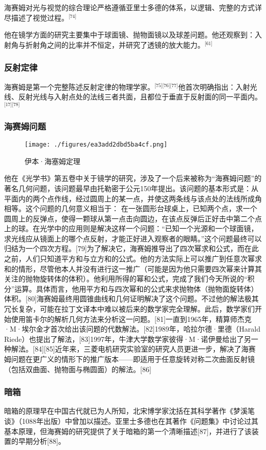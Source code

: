 海赛姆对光与视觉的综合理论严格遵循亚里士多德的体系，以逻辑、完整的方式详尽描述了视觉过程。\(^\text{[74]}\)

他在镜学方面的研究主要集中于球面镜、抛物面镜以及球差问题。他还观察到：入射角与折射角之间的比率并不恒定，并研究了透镜的放大能力。\(^\text{[61]}\)
\subsubsection{反射定律}
海赛姆是第一个完整陈述反射定律的物理学家。\(^\text{[75][76][77]}\)他首次明确指出：入射光线、反射光线与入射点处的法线三者共面，且都位于垂直于反射面的同一平面内。\(^\text{[17][78]}\)
\subsubsection{海赛姆问题}
\begin{figure}[ht]
\centering
\texttt{[image: ./figures/ea3add2dbd5ba4cf.png]}
\caption{伊本·海塞姆定理} \label{fig_YBH_3}
\end{figure}
他在《光学书》第五卷中关于镜学的研究，涉及了一个后来被称为“海赛姆问题”的著名几何问题，该问题最早由托勒密于公元150年提出。该问题的基本形式是：从平面内的两个点作线，经过圆周上的某一点，并使这两条线与该点处的法线所成角相等。这个问题的几何意义相当于：
在一张圆形台球桌上，已知两个点，求一个圆周上的反弹点，使得一颗球从第一点击向圆边，在该点反弹后正好击中第二个点上的球。在光学中的应用则是解决这样一个问题：“已知一个光源和一个球面镜，求光线应从镜面上的哪个点反射，才能正好进入观察者的眼睛。”这个问题最终可以归结为一个四次方程。[79]为了解决它，海赛姆推导出了四次幂求和公式，而在此之前，人们只知道平方和与立方和的公式。他的方法实际上可以推广到任意次幂求和的情形，尽管他本人并没有进行这一推广（可能是因为他只需要四次幂来计算其关注的抛物旋转体的体积）。他利用所得的幂和公式，完成了我们今天所说的“积分”运算。具体而言，他用平方和与四次幂和的公式来求抛物体（抛物面旋转体）体积。[80]海赛姆最终用圆锥曲线和几何证明解决了这个问题。不过他的解法极其冗长复杂，可能在拉丁文译本中难以被后来的数学家完全理解。此后，数学家们开始使用笛卡尔的解析几何方法来分析这一问题。[81]一直到1965年，精算师杰克·M·埃尔金才首次给出该问题的代数解法。[82]1989年，哈拉尔德·里德（Harald Riede）也提出了解法，[83]1997年，牛津大学数学家彼得·M·诺伊曼给出了另一种解法。[84][85]近年来，三菱电机研究实验室的研究人员更进一步，解决了海赛姆问题在更广义的情形下的推广版本——即适用于任意旋转对称二次曲面反射镜（包括双曲面、抛物面与椭圆面）的解法。[86]
\subsubsection{暗箱}
暗箱的原理早在中国古代就已为人所知，北宋博学家沈括在其科学著作《梦溪笔谈》（1088年出版）中曾加以描述。亚里士多德也在其著作《问题集》中讨论过其基本原理，但海赛姆的研究提供了关于暗箱的第一个清晰描述[87]，并进行了该装置的早期分析[88]。

